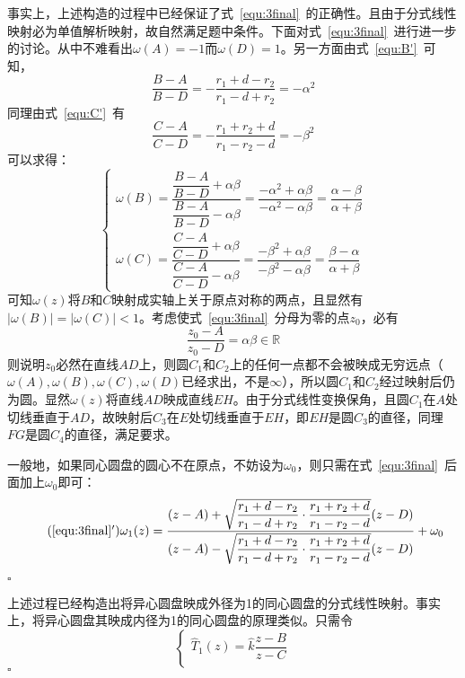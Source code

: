 \documentclass{article}
\newenvironment{SOLUTION}[1][{}]{{\noindent\heiti 解#1：}}{\hfill $\square$\par}
\begin{document}
\begin{SOLUTION}
    事实上，上述构造的过程中已经保证了式~\eqref{equ:3final}~的正确性。且由于分式线性映射必为单值解析映射，故自然满足题中条件。下面对式~\eqref{equ:3final}~进行进一步的讨论。从中不难看出$\omega(A)=-1$而$\omega(D)=1$。另一方面由式~\eqref{equ:B'}~可知，
    $$
    \dfrac{B-A}{B-D}=-\dfrac{r_1+d-r_2}{r_1-d+r_2}=-\alpha^2
    $$
    同理由式~\eqref{equ:C'}~有
    $$
    \dfrac{C-A}{C-D}=-\dfrac{r_1+r_2+d}{r_1-r_2-d}=-\beta^2
    $$
    可以求得：
    \begin{equation}
        \begin{cases}
            \omega(B)=\dfrac{\dfrac{B-A}{B-D}+\alpha\beta}{\dfrac{B-A}{B-D}-\alpha\beta}=\dfrac{-\alpha^2+\alpha\beta}{-\alpha^2-\alpha\beta}=\dfrac{\alpha-\beta}{\alpha+\beta}\\[3ex]
            \omega(C)=\dfrac{\dfrac{C-A}{C-D}+\alpha\beta}{\dfrac{C-A}{C-D}-\alpha\beta}=\dfrac{-\beta^2+\alpha\beta}{-\beta^2-\alpha\beta}=\dfrac{\beta-\alpha}{\alpha+\beta}
        \end{cases}
    \end{equation}
    可知$\omega(z)$将$B$和$C$映射成实轴上关于原点对称的两点，且显然有$|\omega(B)|=|\omega(C)|<1$。考虑使式~\eqref{equ:3final}~分母为零的点$z_0$，必有
    $$
    \dfrac{z_0-A}{z_0-D}=\alpha\beta\in\mathbb{R}
    $$
    则说明$z_0$必然在直线$AD$上，则圆$C_1$和$C_2$上的任何一点都不会被映成无穷远点（$\omega(A),\omega(B),\omega(C),\omega(D)$已经求出，不是$\infty$），所以圆$C_1$和$C_2$经过映射后仍为圆。显然$\omega(z)$将直线$AD$映成直线$EH$。由于分式线性变换保角，且圆$C_1$在$A$处切线垂直于$AD$，故映射后$C_3$在$E$处切线垂直于$EH$，即$EH$是圆$C_3$的直径，同理$FG$是圆$C_4$的直径，满足要求。

    一般地，如果同心圆盘的圆心不在原点，不妨设为$\omega_0$，则只需在式~\eqref{equ:3final}~后面加上$\omega_0$即可：
    \begin{equation}
        \tag{\ref{equ:3final}$'$}
        \omega_1(z)=\dfrac{(z-A)+\sqrt{\dfrac{r_1+d-r_2}{r_1-d+r_2}\cdot\dfrac{r_1+r_2+d}{r_1-r_2-d}}(z-D)}{(z-A)-\sqrt{\dfrac{r_1+d-r_2}{r_1-d+r_2}\cdot\dfrac{r_1+r_2+d}{r_1-r_2-d}}(z-D)}+\omega_0
        \label{equ:3final+1}
    \end{equation}
    
    \hfill $\square$

   上述过程已经构造出将异心圆盘映成外径为1的同心圆盘的分式线性映射。事实上，将异心圆盘其映成内径为1的同心圆盘的原理类似。只需令
    \begin{equation}
        \begin{cases}
        \hat{T}_1(z)=\hat{k}\dfrac{z-B}{z-C}\\
        

\end{cases}
\end{equation}
\end{SOLUTION}
\end{document}
